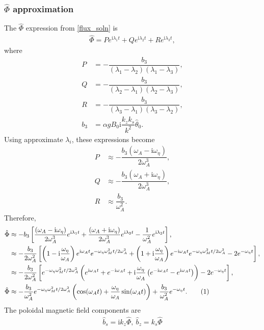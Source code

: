 \documentclass[12pt,psfig]{article}
\newcommand\numberthis{\addtocounter{equation}{1}\tag{\theequation}}
\begin{document}
\subsubsection{$\hat{\Phi}$ approximation}
The $\hat{\Phi}$ expression from \eqref{flux_soln} is
\begin{align*}
\hat{\Phi}=Pe^{\mathrm{i}\lambda_1t}+Qe^{\mathrm{i}\lambda_2t}+Re^{\mathrm{i}\lambda_3t},
\end{align*}
where
\begin{align*}
P&=-\dfrac{b_3}{(\lambda_1-\lambda_2) (\lambda_1-\lambda_3)},\\
Q&=-\dfrac{b_3}{(\lambda_2-\lambda_1) (\lambda_2-\lambda_3)},\\
R&=-\dfrac{b_3}{(\lambda_3-\lambda_1) (\lambda_3-\lambda_2)},\\
b_3&=\alpha g B_0 \mathrm{i} \dfrac{k_z k_s}{k^2} \hat{\theta}_0.
\end{align*}
Using approximate $\lambda_i$, these expressions become
\begin{align*}
P&\approx -\dfrac{b_3(\omega_A-\mathrm{i}\omega_\eta)}{2\omega_A^3},\\
Q&\approx -\dfrac{b_3(\omega_A+\mathrm{i}\omega_\eta)}{2\omega_A^3},\\
R&\approx \dfrac{b_3}{\omega_A^2}.
\end{align*}
Therefore,
\begin{align*}
\hat{\Phi}&\approx -b_3\left[\dfrac{(\omega_A-\mathrm{i}\omega_\eta)}{2\omega_A^3}e^{\mathrm{i}\lambda_1t}+\dfrac{(\omega_A+\mathrm{i}\omega_\eta)}{2\omega_A^3}e^{\mathrm{i}\lambda_2t}-\dfrac{1}{\omega_A^2}e^{\mathrm{i}\lambda_3t}\right],\\
&\approx -\dfrac{b_3}{2\omega_A^2}\left[\left(1-\mathrm{i}\dfrac{\omega_\eta}{\omega_A}\right)e^{\mathrm{i}\omega_At}e^{-\omega_\eta\omega_M^2t/2\omega_A^2}+\left(1+\mathrm{i}\dfrac{\omega_\eta}{\omega_A}\right)e^{-\mathrm{i}\omega_At}e^{-\omega_\eta\omega_M^2t/2\omega_A^2}-2e^{-\omega_\eta t}\right],\\
&\approx -\dfrac{b_3}{2\omega_A^2}\left[e^{-\omega_\eta\omega_M^2t/2\omega_A^2}\left(e^{\mathrm{i}\omega_At}+e^{-\mathrm{i}\omega_At}+\mathrm{i}\dfrac{\omega_\eta}{\omega_A}\left(e^{-\mathrm{i}\omega_At}-e^{\mathrm{i}\omega_At}\right)\right)-2e^{-\omega_\eta t}\right],\\
\hat{\Phi}&\approx -\dfrac{b_3}{\omega_A^2}e^{-\omega_\eta\omega_M^2t/2\omega_A^2}\left(\cos (\omega_A t)+\dfrac{\omega_\eta}{\omega_A}\sin(\omega_A t)\right)+\dfrac{b_3}{\omega_A^2}e^{-\omega_\eta t}. \numberthis \label{Phiapprox}
\end{align*}
The poloidal magnetic field components are
\begin{align*}
\hat{b}_s=\mathrm{i}k_z\hat{\Phi}, \ \hat{b}_z=k_s\hat{\Phi}
\end{align*}
\end{document}
